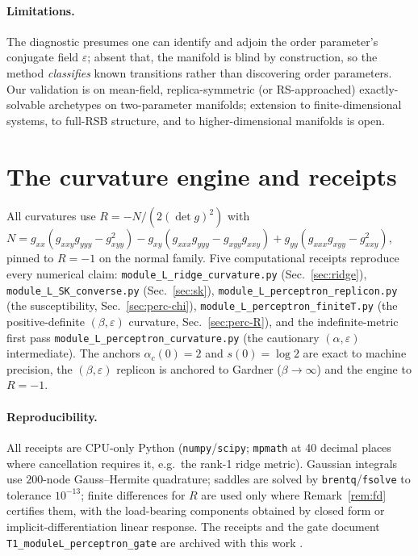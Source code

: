 \documentclass[a4paper,11pt]{article}
\theoremstyle{plain}
\theoremstyle{definition}
\theoremstyle{remark}
\newcommand{\Ric}{R}
\newcommand{\eps}{\varepsilon}
\newcommand{\detg}{\det g}
\begin{document}
\paragraph{Limitations.} The diagnostic presumes one can identify and adjoin the order parameter's conjugate
field $\eps$; absent that, the manifold is blind by construction, so the method \emph{classifies} known
transitions rather than discovering order parameters. Our validation is on mean-field, replica-symmetric (or
RS-approached) exactly-solvable archetypes on two-parameter manifolds; extension to finite-dimensional
systems, to full-RSB structure, and to higher-dimensional manifolds is open.

\appendix
\section{The curvature engine and receipts}\label{app:engine}
All curvatures use $\Ric=-N/(2(\detg)^2)$ with $N=g_{xx}(g_{xxy}g_{yyy}-g_{xyy}^2)
-g_{xy}(g_{xxx}g_{yyy}-g_{xyy}g_{xxy})+g_{yy}(g_{xxx}g_{xyy}-g_{xxy}^2)$, pinned to $\Ric=-1$ on the normal
family. Five computational receipts reproduce every numerical claim:
\texttt{module\_L\_ridge\_curvature.py} (Sec.~\ref{sec:ridge}),
\texttt{module\_L\_SK\_converse.py} (Sec.~\ref{sec:sk}),
\texttt{module\_L\_perceptron\_replicon.py} (the susceptibility, Sec.~\ref{sec:perc-chi}),
\texttt{module\_L\_perceptron\_finiteT.py} (the positive-definite $(\beta,\eps)$ curvature, Sec.~\ref{sec:perc-R}),
and the indefinite-metric first pass \texttt{module\_L\_perceptron\_curvature.py} (the cautionary
$(\alpha,\eps)$ intermediate). The anchors $\alpha_c(0)=2$ and $s(0)=\log2$ are exact to machine precision,
the $(\beta,\eps)$ replicon is anchored to Gardner ($\beta\!\to\!\infty$) and the engine to $\Ric=-1$.

\paragraph{Reproducibility.} All receipts are CPU-only Python (\texttt{numpy}/\texttt{scipy}; \texttt{mpmath}
at 40 decimal places where cancellation requires it, e.g.\ the rank-1 ridge metric). Gaussian integrals use
$200$-node Gauss--Hermite quadrature; saddles are solved by \texttt{brentq}/\texttt{fsolve} to tolerance
$10^{-13}$; finite differences for $\Ric$ are used only where Remark~\ref{rem:fd} certifies them, with the
load-bearing components obtained by closed form or implicit-differentiation linear response. The receipts and
the gate document \texttt{T1\_moduleL\_perceptron\_gate} are archived with this work \cite{repo}.
\end{document}
